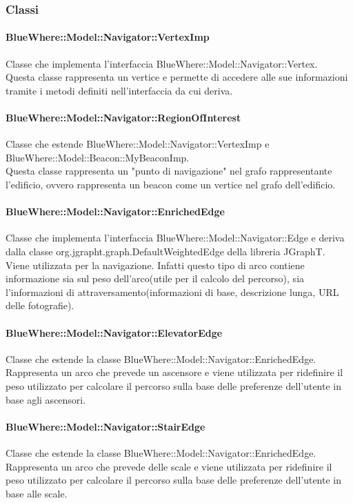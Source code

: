 \documentclass[../SpecificaTecnica.tex]{subfiles}
\begin{document}
			\subsubsection{Classi}
				\paragraph{BlueWhere::Model::Navigator::VertexImp}
					Classe che implementa l'interfaccia BlueWhere::Model::Navigator::Vertex. \\
					Questa classe rappresenta un vertice e permette di accedere alle sue informazioni tramite i metodi definiti nell'interfaccia da cui deriva.
				\paragraph{BlueWhere::Model::Navigator::RegionOfInterest}
					Classe che estende BlueWhere::Model::Navigator::VertexImp e BlueWhere::Model::Beacon::MyBeaconImp. \\
					Questa classe rappresenta un "punto di navigazione" nel grafo rappresentante l'edificio, ovvero rappresenta un beacon come un vertice nel grafo dell'edificio.
				\paragraph{BlueWhere::Model::Navigator::EnrichedEdge}
					Classe che implementa l'interfaccia BlueWhere::Model::Navigator::Edge e deriva dalla classe org.jgrapht.graph.DefaultWeightedEdge della libreria JGraphT. \\
					Viene utilizzata per la navigazione. Infatti questo tipo di arco contiene informazione sia sul peso dell'arco(utile per il calcolo del percorso), sia l'informazioni di attraversamento(informazioni di base, descrizione lunga, URL delle fotografie).
				\paragraph{BlueWhere::Model::Navigator::ElevatorEdge}
					Classe che estende la classe BlueWhere::Model::Navigator::EnrichedEdge. \\
					Rappresenta un arco che prevede un ascensore e viene utilizzata per ridefinire il peso utilizzato per calcolare il percorso sulla base delle preferenze dell'utente in base agli ascensori.
				\paragraph{BlueWhere::Model::Navigator::StairEdge}
					Classe che estende la classe BlueWhere::Model::Navigator::EnrichedEdge. \\
					Rappresenta un arco che prevede delle scale e viene utilizzata per ridefinire il peso utilizzato per calcolare il percorso sulla base delle preferenze dell'utente in base alle scale.
\end{document}
